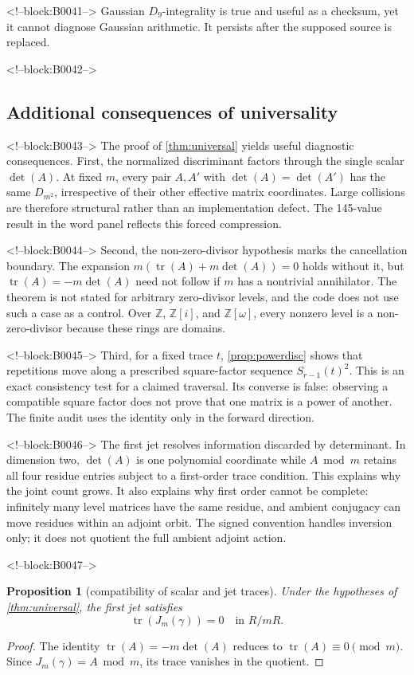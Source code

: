 \documentclass[11pt,a4paper]{article}
\newtheorem{proposition}[theorem]{Proposition}
\theoremstyle{definition}
\theoremstyle{remark}
\newcommand{\tr}{\operatorname{tr}}
\newcommand{\Gauss}{\mathbb{Z}[i]}
\newcommand{\Eis}{\mathbb{Z}[\omega]}
\begin{document}
<!--block:B0041-->
Gaussian \(D_9\)-integrality is true and useful as a checksum, yet it cannot diagnose Gaussian arithmetic. It persists after the supposed source is replaced.

<!--block:B0042-->
\subsection{Additional consequences of universality}

<!--block:B0043-->
The proof of \cref{thm:universal} yields useful diagnostic consequences. First, the normalized discriminant factors through the single scalar \(\det(A)\). At fixed \(m\), every pair \(A,A'\) with \(\det(A)=\det(A')\) has the same \(D_{m^2}\), irrespective of their other effective matrix coordinates. Large collisions are therefore structural rather than an implementation defect. The 145-value result in the word panel reflects this forced compression.

<!--block:B0044-->
Second, the non-zero-divisor hypothesis marks the cancellation boundary. The expansion \(m(\tr(A)+m\det(A))=0\) holds without it, but \(\tr(A)=-m\det(A)\) need not follow if \(m\) has a nontrivial annihilator. The theorem is not stated for arbitrary zero-divisor levels, and the code does not use such a case as a control. Over \(\mathbb Z\), \(\Gauss\), and \(\Eis\), every nonzero level is a non-zero-divisor because these rings are domains.

<!--block:B0045-->
Third, for a fixed trace \(t\), \cref{prop:powerdisc} shows that repetitions move along a prescribed square-factor sequence \(S_{r-1}(t)^2\). This is an exact consistency test for a claimed traversal. Its converse is false: observing a compatible square factor does not prove that one matrix is a power of another. The finite audit uses the identity only in the forward direction.

<!--block:B0046-->
The first jet resolves information discarded by determinant. In dimension two, \(\det(A)\) is one polynomial coordinate while \(A\bmod m\) retains all four residue entries subject to a first-order trace condition. This explains why the joint count grows. It also explains why first order cannot be complete: infinitely many level matrices have the same residue, and ambient conjugacy can move residues within an adjoint orbit. The signed convention handles inversion only; it does not quotient the full ambient adjoint action.

<!--block:B0047-->
\begin{proposition}[compatibility of scalar and jet traces]\label{prop:jettrace}
Under the hypotheses of \cref{thm:universal}, the first jet satisfies
\[
 \tr(J_m(\gamma))=0\quad\text{in }R/mR.
\]
\end{proposition}
\begin{proof}
The identity \(\tr(A)=-m\det(A)\) reduces to \(\tr(A)\equiv0\pmod m\). Since \(J_m(\gamma)=A\bmod m\), its trace vanishes in the quotient.
\end{proof}
\end{document}
